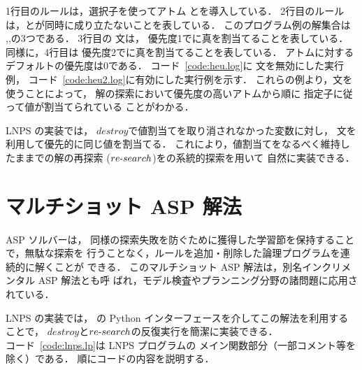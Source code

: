1行目のルールは，選択子を使ってアトム
とを導入している．
2行目のルールは，とが同時に成り立たないことを表している．
このプログラム例の解集合は
\code{\{\}},,の3つである．
3行目の 文は，
優先度1でに真を割当てることを表している．
同様に，4行目は
優先度2でに真を割当てることを表している．
アトムに対するデフォルトの優先度は0である．
%
コード~\ref{code:heu.log}に 文を無効にした実行例，
コード~\ref{code:heu2.log}に有効にした実行例を示す．
これらの例より，文を使うことによって，
解の探索において優先度の高いアトムから順に
指定子に従って値が割当てられている
ことがわかる．

LNPS の実装では，
$destroy$で値割当てを取り消されなかった変数に対し，
文を利用して優先的に同じ値を割当てる．
これにより，値割当てをなるべく維持したままでの解の再探索
($re\mathchar`-search$)を{\clingo}の系統的探索を用いて
自然に実装できる．

\section{マルチショット ASP 解法}







ASP ソルバー{\clingo}は，
同様の探索失敗を防ぐために獲得した学習節を保持することで，無駄な探索を
行うことなく，ルールを追加・削除した論理プログラムを連続的に解くことが
できる．
このマルチショット ASP 解法は，別名インクリメンタル ASP 解法とも呼
ばれ，モデル検査やプランニング分野の諸問題に応用されている．

LNPS の実装では，
{\clingo}の Python インターフェースを介してこの解法を利用することで，
$destroy$と$re\mathchar`-search$の反復実行を簡潔に実装できる．\\

コード~\ref{code:lnps.lp}は LNPS プログラムの
メイン関数部分（一部コメント等を除く）である．
順にコードの内容を説明する．\\


